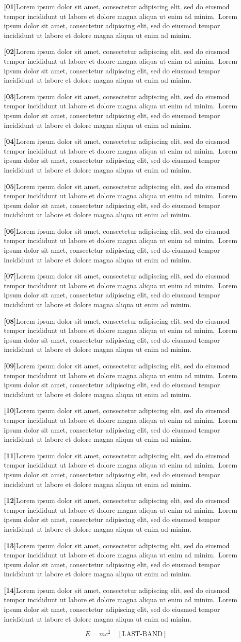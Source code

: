 \documentclass[twocolumn]{article}
\newcommand\Body{Lorem ipsum dolor sit amet, consectetur adipiscing elit, sed do
eiusmod tempor incididunt ut labore et dolore magna aliqua ut enim ad minim.}
\newcommand\Par[1]{\par\noindent\textbf{[#1]}\space\Body\ \Body\par\medskip}
\begin{document}
\Par{01}\Par{02}\Par{03}\Par{04}\Par{05}\Par{06}\Par{07}\Par{08}\Par{09}\Par{10}
\Par{11}\Par{12}\Par{13}\Par{14}
\begin{wideband}\[ E=mc^2 \quad[\text{LAST-BAND}] \]\end{wideband}
\end{document}
